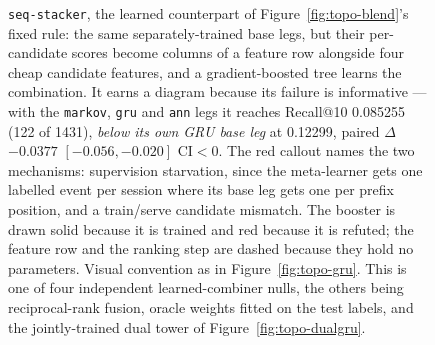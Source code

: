 \begin{figure}[ht]
  \caption{\texttt{seq-stacker}, the learned counterpart of
    Figure~\ref{fig:topo-blend}'s fixed rule: the same separately-trained base
    legs, but their per-candidate scores become columns of a feature row
    alongside four cheap candidate features, and a gradient-boosted tree
    learns the combination. It earns a diagram because its failure is
    informative --- with the \texttt{markov}, \texttt{gru} and \texttt{ann}
    legs it reaches Recall@10 \num{0.085255} (\num{122} of \num{1431}),
    \emph{below its own GRU base leg} at \num{0.12299}, paired $\Delta$
    $-\num{0.0377}$ $[-0.056, -0.020]$ CI$<$0. The red callout names the two
    mechanisms: supervision starvation, since the meta-learner gets one
    labelled event per session where its base leg gets one per prefix
    position, and a train/serve candidate mismatch. The booster is drawn solid
    because it is trained and red because it is refuted; the feature row and
    the ranking step are dashed because they hold no parameters. Visual
    convention as in Figure~\ref{fig:topo-gru}. This is one of four
    independent learned-combiner nulls, the others being reciprocal-rank
    fusion, oracle weights fitted on the test labels, and the jointly-trained
    dual tower of Figure~\ref{fig:topo-dualgru}.}
  \label{fig:topo-stacker}
\end{figure}
